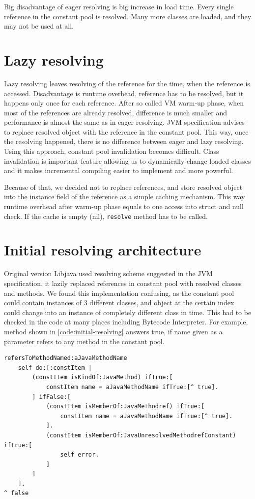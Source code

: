 \documentclass[11pt,twoside,a4paper]{book}
\newcommand{\libjava}{{Libjava}}
\begin{document}
Big disadvantage of eager resolving is big increase in load time.
Every single reference in the constant pool is resolved.
Many more classes are loaded, and they may not be used at all.

\section{Lazy resolving}

Lazy resolving leaves resolving of the reference for the time, when the reference is accessed. 
Disadvantage is runtime overhead, reference has to be resolved, but it happens only once for each reference.
After so called VM warm-up phase, when most of the references are already resolved, difference is much smaller and performance is almost the same as in eager resolving.
JVM specification \cite[section~2.17]{vmspec} advises to replace resolved object with the reference in the constant pool. 
This way, once the resolving happened, there is no difference between eager and lazy resolving.
Using this approach, constant pool invalidation becomes difficult.
Class invalidation is important feature allowing us to dynamically change loaded classes and it makes incremental compiling easier to implement and more powerful.

Because of that, we decided not to replace references, and store resolved object into the instance field of the reference as a simple caching mechanism. 
This way runtime overhead after warm-up phase equals to one access into struct and null check.
If the cache is empty (nil), \texttt{resolve} method has to be called.

\section{Initial resolving architecture}

Original version \libjava{} used resolving scheme suggested in the JVM specification, it lazily replaced references in constant pool with resolved classes and methods.
We found this implementation confusing, as the constant pool could contain instances of 3 different classes, and object at the certain index could change into an instance of completely different class in time. 
This had to be checked in the code at many places including Bytecode Interpreter. 
For example, method shown in \ref{code:initial-resolving} answers true, if name given as a parameter refers to any method in the constant pool.

\begin{lstlisting}[caption=Initial resolving logic example, label=code:initial-resolving]
refersToMethodNamed:aJavaMethodName
    self do:[:constItem |
        (constItem isKindOf:JavaMethod) ifTrue:[
            constItem name = aJavaMethodName ifTrue:[^ true].
        ] ifFalse:[
            (constItem isMemberOf:JavaMethodref) ifTrue:[
                constItem name = aJavaMethodName ifTrue:[^ true].
            ].
            (constItem isMemberOf:JavaUnresolvedMethodrefConstant) ifTrue:[
                self error.
            ]
        ]
    ].
^ false
\end{lstlisting}
\end{document}
